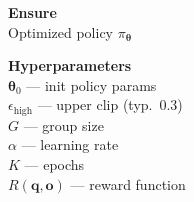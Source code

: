 \documentclass[11pt]{article}
\begin{document}
\begin{algorithm}[p]\small
\caption{CISPO (Clipped Importance Sampling Policy Optimization)}\label{alg:cispo}
\vspace{2pt}
\noindent
\begin{minipage}[t]{0.28\linewidth}
\renewcommand{\arraystretch}{1.12}
\textbf{Ensure} \\[2pt]
Optimized policy $\pi_{\boldsymbol{\theta}}$

\vspace{6pt}
\textbf{Hyperparameters} \\[2pt]
$\boldsymbol{\theta}_0$ --- init policy params \\
$\epsilon_{\text{high}}$ --- upper clip (typ.\ $0.3$) \\
$G$ --- group size \\
$\alpha$ --- learning rate \\
$K$ --- epochs \\
$R(\mathbf{q}, \mathbf{o})$ --- reward function


\end{minipage}
\end{algorithm}
\end{document}
